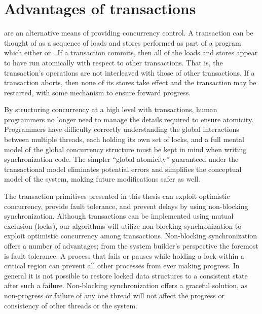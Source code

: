 \section{Advantages of transactions}

 are
an alternative means of providing concurrency control.
A transaction can be thought of as a sequence of loads and stores
performed as part of a program which either
 or .  If a transaction
commits, then all of the loads and stores appear to have run
atomically with respect to other transactions.  That is, the
transaction's operations are not interleaved with those of other
transactions.  If a transaction aborts, then none of its stores take
effect and the transaction may be restarted, with some mechanism to
ensure forward progress.

By structuring concurrency at a high level with transactions, human
programmers no longer need to manage the details required to ensure
atomicity.  Programmers have difficulty correctly understanding the global
interactions between multiple threads, each holding its own set of
locks, and a full mental model of the global concurrency structure
must be kept in mind when writing synchronization code.
The simpler ``global atomicity'' guaranteed under the
transactional model eliminates potential errors and simplifies the conceptual
model of the system, making future modifications safer as
well.

The transaction primitives presented in this thesis can exploit
optimistic concurrency, provide fault tolerance, and prevent delays by
using non-blocking synchronization.  Although transactions can be
implemented using mutual exclusion (locks), our algorithms will
utilize non-blocking synchronization 
\cite{Lamport77,Herlihy88,HerlihyLuMo03,MassalinPu91,GreenwaldCh96} to
exploit optimistic concurrency among transactions.  Non-blocking
synchronization offers a number of advantages; from the system
builder's perspective the foremost is fault tolerance.  A process that
fails or pauses while holding a lock within a critical region can
prevent all other processes from ever making progress.  In general it
is not possible to restore locked data structures to a
consistent state after such a failure.  Non-blocking synchronization
offers a graceful solution, as non-progress or failure
of any one thread will not affect the progress or consistency of other
threads or the system.

